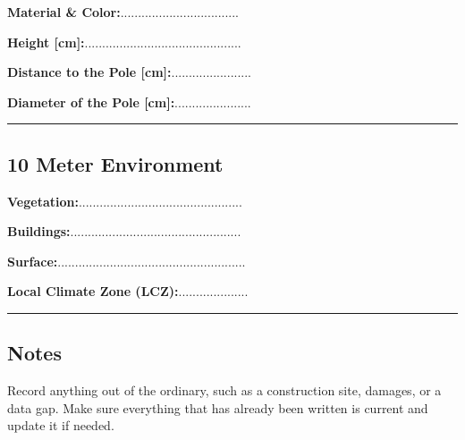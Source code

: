 \begin{multicols}{2}
\textbf{Material \& Color:}..................................\hfill \newline

\textbf{Height [cm]:}.............................................\hfill \newline

\columnbreak
\textbf{Distance to the Pole [cm]:}.......................\hfill \newline

\textbf{Diameter of the Pole [cm]:}......................\hfill \newline

\end{multicols}

\vspace{-10mm}
\rule{\linewidth}{0.1mm}

\vspace{-5mm}
\subsection*{10 Meter Environment}

\begin{multicols}{2}
\textbf{Vegetation:}...............................................\hfill \newline

\textbf{Buildings:}.................................................\hfill \newline
\columnbreak

\textbf{Surface:}......................................................\hfill \newline

\textbf{Local Climate Zone (LCZ):}....................\hfill
\end{multicols}
\vspace{-10mm}
\rule{\linewidth}{0.1mm}

\vspace{-5mm}
\subsection*{Notes}
Record anything out of the ordinary, such as a construction site, damages, or a data gap. Make sure everything that has already been written is current and update it if needed.\newline

